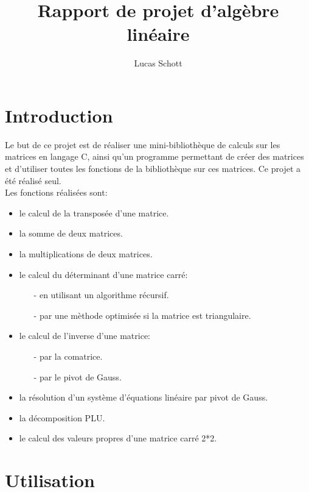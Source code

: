 \documentclass[a4paper,11pt,DIV=11]{scrartcl}
\title{Rapport de projet d'algèbre linéaire}
\author{Lucas Schott}
\begin{document}
\begin{onehalfspace}

    \maketitle

    \section*{Introduction}


    Le but de ce projet est de réaliser une mini-bibliothèque de calculs sur les matrices en langage C,
    ainsi qu'un programme permettant de créer des matrices et d'utiliser toutes les fonctions de 
    la bibliothèque sur ces matrices. Ce projet a été réalisé seul.\\
    Les fonctions réalisées sont:
    \begin{itemize}
        \item le calcul de la transposée d'une matrice.
        \item la somme de deux matrices.
        \item la multiplications de deux matrices.
        \item le calcul du déterminant d'une matrice carré:
            \begin{itemize}
                \item[-] en utilisant un algorithme récursif.
                \item[-] par une mèthode optimisée si la matrice est triangulaire.
            \end{itemize}
        \item le calcul de l'inverse d'une matrice:
            \begin{itemize}
                \item[-] par la comatrice.
                \item[-] par le pivot de Gauss.
            \end{itemize}
        \item la résolution d'un système d'équations linéaire par pivot de Gauss.
        \item la décomposition PLU.\@
        \item le calcul des valeurs propres d'une matrice carré 2*2.
    \end{itemize}


    \section*{Utilisation}



\end{onehalfspace}
\end{document}
